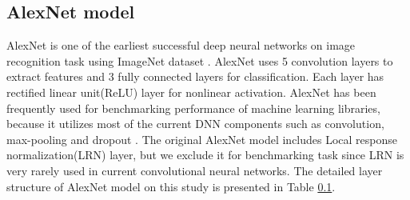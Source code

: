 \documentclass[conference]{IEEEtran}
\begin{document}
\subsection{AlexNet model}
AlexNet \cite{} is one of the earliest successful deep neural networks on image recognition task using ImageNet dataset \cite{}.
AlexNet uses 5 convolution layers to extract features and 3 fully connected layers for classification.
Each layer has rectified linear unit(ReLU) layer for nonlinear activation.
AlexNet has been frequently used for benchmarking performance of machine learning libraries, because it utilizes most of the current DNN components such as convolution, max-pooling and dropout \cite{}.
The original AlexNet model includes Local response normalization(LRN) layer, but we exclude it for benchmarking task since LRN is very rarely used in current convolutional neural networks.
The detailed layer structure of AlexNet model on this study is presented in Table \ref{}.
\end{document}

